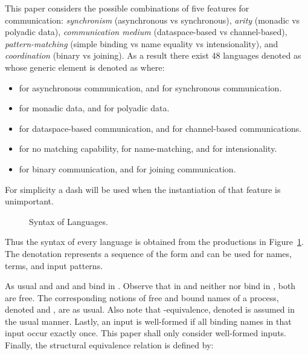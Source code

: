 \documentclass[submission,copyright,creativecommons]{eptcs}
\begin{document}
This paper considers the possible combinations of five features for communication:
{\em synchronism} (asynchronous vs synchronous),
{\em arity} (monadic vs polyadic data),
{\em communication medium} (dataspace-based vs channel-based),
{\em pattern-matching} (simple binding vs name equality vs intensionality),
and {\em coordination} (binary vs joining).
As a result there exist 48 languages denoted as  whose generic element is denoted as  where:
\begin{itemize}
\item  for asynchronous communication, and  for synchronous communication.
\item  for monadic data, and  for polyadic data.
\item  for dataspace-based communication, and  for channel-based communications.
\item  for no matching capability,  for name-matching, and  for intensionality.
\item  for binary communication, and  for joining communication.
\end{itemize}
For simplicity a dash  will be used when the instantiation of that feature is unimportant.

\begin{figure}[t]

\caption{Syntax of Languages.}
\label{fig:syntax}
\vspace{-0.3cm}
\end{figure}

Thus the syntax of every language is obtained from the productions in Figure~\ref{fig:syntax}.
The denotation  represents a sequence of the form  and can be used for names, terms, and input patterns.

As usual  and  and  and  bind  in .
Observe that in  and 
neither  nor  bind in , both are free.
The corresponding notions of free and bound names of a process, denoted  and ,
are as usual.
Also note that -equivalence, denoted  is assumed in the usual manner.
Lastly, an input is well-formed if all binding names in that input occur exactly once. This paper shall only consider well-formed inputs.
Finally, the structural equivalence relation  is defined by: 
\end{document}
